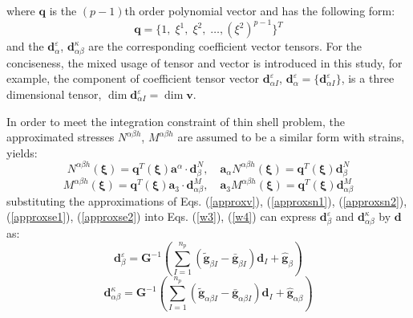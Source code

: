 where $\boldsymbol q$ is the $(p-1)$th order polynomial vector and has the following form:
\begin{equation}
\boldsymbol q = \{ 1,\; \xi^1,\; \xi^2,\; \dots, (\xi^2)^{p-1}\}^T
\end{equation}
and the $\boldsymbol d^\varepsilon_{\alpha}$, $\boldsymbol d^\kappa_{\alpha\beta}$ are the corresponding coefficient vector tensors. For the conciseness, the mixed usage of tensor and vector is introduced in this study, for example, the component of coefficient tensor vector $\boldsymbol d^\varepsilon_{\alpha I}$, $\boldsymbol d^\varepsilon_\alpha = \{\boldsymbol d^\varepsilon_{\alpha I}\}$, is a three dimensional tensor, $\dim \boldsymbol d^\varepsilon_{\alpha I} = \dim \boldsymbol v$.

In order to meet the integration constraint of thin shell problem, the approximated stresses $N^{\alpha\beta h}$, $M^{\alpha\beta h}$ are assumed to be a similar form with strains, yields:
\begin{equation}\label{approxse1}
N^{\alpha\beta h}(\boldsymbol \xi) = \boldsymbol q^T(\boldsymbol \xi) \boldsymbol a^\alpha \cdot \boldsymbol d_{\beta}^N,\quad
\boldsymbol a_\alpha N^{\alpha\beta h}(\boldsymbol \xi) = \boldsymbol q^T(\boldsymbol \xi) \boldsymbol d^N_\beta
\end{equation}
\begin{equation}\label{approxse2}
    M^{\alpha\beta h}(\boldsymbol \xi) = \boldsymbol q^T(\boldsymbol \xi) \boldsymbol a_3 \cdot \boldsymbol d_{\alpha\beta}^M,\quad
    \boldsymbol a_3 M^{\alpha\beta h}(\boldsymbol \xi) = \boldsymbol q^T(\boldsymbol \xi) \boldsymbol d_{\alpha\beta}^M
\end{equation}
substituting the approximations of Eqs. (\ref{approxv}), (\ref{approxsn1}), (\ref{approxsn2}), (\ref{approxse1}), (\ref{approxse2}) into Eqs. (\ref{w3}), (\ref{w4}) can express $\boldsymbol d^\varepsilon_\beta$ and $\boldsymbol d^\kappa_{\alpha\beta}$ by $\boldsymbol d$ as:
\begin{equation}\label{depsilon}
\boldsymbol d^\varepsilon_\beta = \boldsymbol G^{-1} \left (\sum_{I=1}^{n_p}(\tilde{\boldsymbol g}_{\beta I} - \bar{\boldsymbol g}_{\beta I}) \boldsymbol d_I + \hat{\boldsymbol g}_\beta \right )
\end{equation}
\begin{equation}\label{dkappa}
\boldsymbol d^\kappa_{\alpha\beta} = \boldsymbol G^{-1} \left (\sum_{I=1}^{n_p}(\tilde{\boldsymbol g}_{\alpha\beta I} - \bar{\boldsymbol g}_{\alpha\beta I})\boldsymbol d_I + \hat{\boldsymbol g}_{\alpha\beta} \right )
\end{equation}
